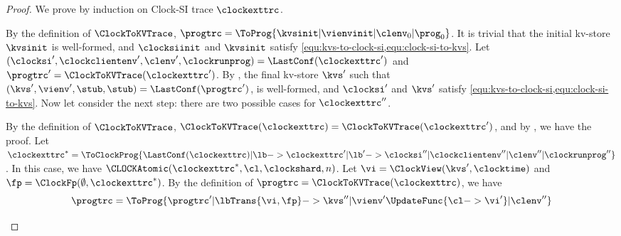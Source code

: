 \begin{proof}
We prove by induction on Clock-SI trace \( \clockexttrc \).
\begin{enumerate}
    By  the definition of \( \ClockToKVTrace \),
    \( \progtrc = \ToProg{ \kvsinit | \vienvinit | \clenv_0 | \prog_0 } \).
    It is trivial that the initial kv-store \( \kvsinit \) is well-formed,
    and \( \clocksiinit \) and \( \kvsinit \)  satisfy 
    \cref{equ:kvs-to-clock-si,equ:clock-si-to-kvs}.
    Let \( (\clocksi',\clockclientenv',\clenv',\clockrunprog) = \LastConf(\clockexttrc') \)
    and \( \progtrc' = \ClockToKVTrace(\clockexttrc') \).
    By \ih, the final kv-store \( \kvs' \) such that \( (\kvs',\vienv',\stub,\stub) = \LastConf(\progtrc') \),
    is well-formed,
    and \( \clocksi'\) and \( \kvs' \) satisfy
    \cref{equ:kvs-to-clock-si,equ:clock-si-to-kvs}.
    Now let consider the next step:
    there are two possible cases for \( \clockexttrc''\).
    \begin{enumerate}
        By the definition of \( \ClockToKVTrace \), \( \ClockToKVTrace(\clockexttrc) = \ClockToKVTrace(\clockexttrc') \),
        and by \ih, we have the proof.
        Let \( \clockexttrc^* = 
                \ToClockProg{\LastConf(\clockexttrc) | \lb 
                            -> \clockexttrc' | \lb' 
                            -> \clocksi'' | \clockclientenv'' | \clenv'' | \clockrunprog'' } \).
        In this case, we have \( \CLOCKAtomic(\clockexttrc^*,\cl,\clockshard,n) \).
        Let \( \vi = \ClockView(\kvs',\clocktime) \) and \( \fp =  \ClockFp(\emptyset,\clockexttrc^*) \).
        By the definition of \( \progtrc = \ClockToKVTrace(\clockexttrc) \), we have 
        \[
            \progtrc = \ToProg{\progtrc' | \lbTrans{\vi,\fp} 
                                    ->  \kvs''
                                       | \vienv'\UpdateFunc{\cl -> \vi'} 
                                       | \clenv'' 
}\]
\end{enumerate}
\end{enumerate}
\end{proof}
